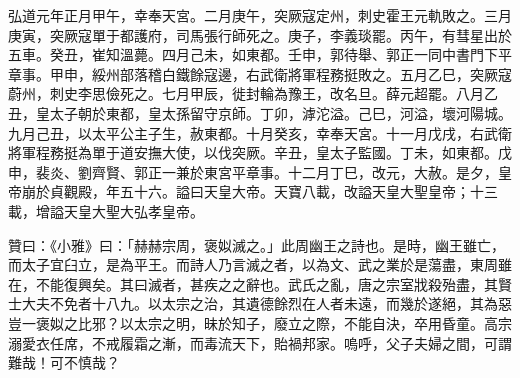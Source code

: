 \begin{pinyinscope}
 弘道元年正月甲午，幸奉天宮。二月庚午，突厥寇定州，刺史霍王元軌敗之。三月庚寅，突厥寇單于都護府，司馬張行師死之。庚子，李義琰罷。丙午，有彗星出於五車。癸丑，崔知溫薨。四月己未，如東都。壬申，郭待舉、郭正一同中書門下平章事。甲申，綏州部落稽白鐵餘寇邊，右武衛將軍程務挺敗之。五月乙巳，突厥寇蔚州，刺史李思儉死之。七月甲辰，徙封輪為豫王，改名旦。薛元超罷。八月乙丑，皇太子朝於東都，皇太孫留守京師。丁卯，滹沱溢。己巳，河溢，壞河陽城。九月己丑，以太平公主子生，赦東都。十月癸亥，幸奉天宮。十一月戊戌，右武衛將軍程務挺為單于道安撫大使，以伐突厥。辛丑，皇太子監國。丁未，如東都。戊申，裴炎、劉齊賢、郭正一兼於東宮平章事。十二月丁巳，改元，大赦。是夕，皇帝崩於貞觀殿，年五十六。謚曰天皇大帝。天寶八載，改謚天皇大聖皇帝；十三載，增謚天皇大聖大弘孝皇帝。



 贊曰：《小雅》曰：「赫赫宗周，褒姒滅之。」此周幽王之詩也。是時，幽王雖亡，而太子宜臼立，是為平王。而詩人乃言滅之者，以為文、武之業於是蕩盡，東周雖在，不能復興矣。其曰滅者，甚疾之之辭也。武氏之亂，唐之宗室戕殺殆盡，其賢士大夫不免者十八九。以太宗之治，其遺德餘烈在人者未遠，而幾於遂絕，其為惡豈一褒姒之比邪？以太宗之明，昧於知子，廢立之際，不能自決，卒用昏童。高宗溺愛衣任席，不戒履霜之漸，而毒流天下，貽禍邦家。嗚呼，父子夫婦之間，可謂難哉！可不慎哉？



\end{pinyinscope}